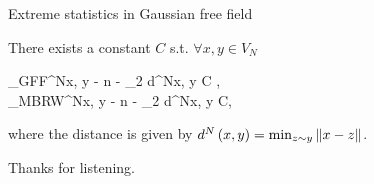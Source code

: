 \documentclass{beamer}
\begin{document}
\begin{frame}{Extreme statistics in Gaussian free field}
\begin{Prop}
		There exists a constant $C$ s.t. $\forall x, y \in V_N$
		\bequ
			\begin{aligned}
				\lv \Cov_{GFF}^N\lp x, y \rp - \lp n - \log_2 d^N\lp x, y \rp \rp \rv \leq C		,		\\
				\lv \Cov_{MBRW}^N\lp x, y \rp - \lp n - \log_2 d^N\lp x, y \rp \rp \rv \leq C,
			\end{aligned}
		\eequ
		where the distance is given by $d^N\left( x, y \right) = 
		\min_{z \sim y}\left\| x - z \right\|$.
	\end{Prop}
\end{frame}

\begin{frame}
	Thanks for listening.
\end{frame}
\end{document}
